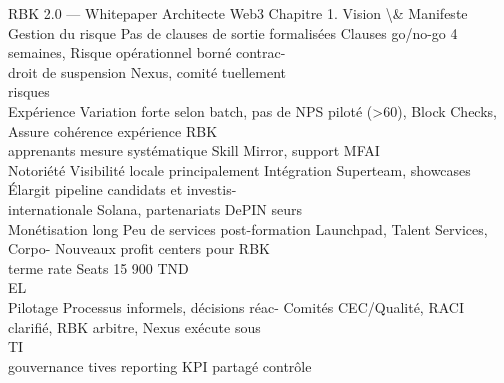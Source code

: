 RBK 2.0 — Whitepaper Architecte Web3                                                                       Chapitre 1. Vision \textbackslash{}& Manifeste\\
\vspace{0.5em}
\vspace{0.5em}
\vspace{0.5em}
Gestion du risque    Pas de clauses de sortie formalisées Clauses go/no-go 4 semaines, Risque opérationnel borné contrac-\\
droit de suspension Nexus, comité tuellement\\
risques\\
Expérience           Variation forte selon batch, pas de NPS piloté (\textgreater{}60), Block Checks, Assure cohérence expérience RBK\\
apprenants           mesure systématique                 Skill Mirror, support MFAI\\
Notoriété            Visibilité locale principalement    Intégration Superteam, showcases Élargit pipeline candidats et investis-\\
internationale                                           Solana, partenariats DePIN       seurs\\
Monétisation long    Peu de services post-formation      Launchpad, Talent Services, Corpo- Nouveaux profit centers pour RBK\\
terme                                                    rate Seats 15 900 TND\\
\vspace{0.5em}
\vspace{0.5em}
\vspace{0.5em}
\vspace{0.5em}
EL\\
Pilotage             Processus informels, décisions réac- Comités CEC/Qualité, RACI clarifié, RBK arbitre, Nexus exécute sous\\
\vspace{0.5em}
\vspace{0.5em}
\vspace{0.5em}
\vspace{0.5em}
TI\\
gouvernance          tives                                reporting KPI partagé               contrôle\\
\vspace{0.5em}
\vspace{0.5em}
\vspace{0.5em}
\vspace{0.5em}

